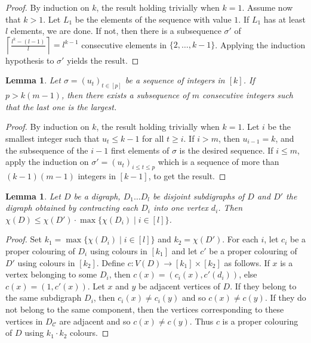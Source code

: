 \documentclass[utf8,10pt]{article}
\theoremstyle{plain}
\newtheorem{lemma}[theorem]{Lemma}
\theoremstyle{definition}
\theoremstyle{remark}
\begin{document}
\begin{proof}
By induction on $k$, the result holding trivially when $k=1$. Assume now that $k>1$. Let $L_1$ be the elements of the sequence with value $1$. If $L_1$ has at least $l$ elements, we are done.
If not, then there is a subsequence $\sigma'$ of $\left\lceil \frac{l^k-(l-1)}{l}\right \rceil = l^{k-1}$ consecutive elements in $\{2, \dots , k-1\}$. Applying the induction hypothesis to $\sigma'$ yields the result.
\end{proof}

\begin{lemma}\label{max}
Let $\sigma=(u_t)_{t\in [p]}$ be a sequence of integers in $[k]$. 
If $p > k (m-1)$, then there exists a subsequence of $m$ consecutive integers such that the
last one is the largest.
\end{lemma}

\begin{proof}
By induction on $k$, the result holding trivially when $k=1$. 
Let $i$ be the smallest integer such that $u_t\leq k-1$ for all $t\geq i$.
If $i>m$, then $u_{i-1}=k$, and the subsequence of the $i-1$ first elements of $\sigma$ is the desired sequence.
If $i\leq m$, apply the induction on $\sigma'=(u_t)_{i\leq t\leq p}$ which is a sequence of more than $(k-1)(m-1)$ integers in $[k-1]$, to get the result. 
\end{proof}

\begin{lemma}\label{lem:contrac}
Let $D$ be a digraph, $D_1 \dots D_l$ be disjoint subdigraphs of $D$ and $D'$ the digraph obtained by contracting each $D_i$ into
one vertex $d_i$. Then $\chi(D) \leq \chi(D')\cdot \max\{\chi(D_i) \mid i \in [l]\}$.
\end{lemma}

\begin{proof}

Set $k_1 = \max\{\chi(D_i) \mid i \in [l]\}$ and $k_2 = \chi(D')$. For each $i$, let $c_i$ be a proper colouring of $D_i$ using colours in $[k_1]$ and let
$c'$ be a proper colouring of $D'$ using colours in $[k_2]$. 
Define $c : V(D) \rightarrow [k_1] \times [k_2]$ as follows. If $x$ is a vertex belonging to some $D_i$, then $c(x) = (c_i(x), c'(d_i))$, else $c(x) =(1,c'(x))$. 
Let $x$ and $y$ be adjacent vertices of $D$. If they belong to the same subdigraph $D_i$, then $c_i(x) \not = c_i(y)$ and so $c(x) \not = c(y)$. If they do not belong
to the same component, then the vertices corresponding to these vertices in $D_{\mathcal{C}}$ are adjacent and so $c(x) \not = c(y)$. 
Thus $c$ is a proper colouring of $D$ using $k_1\cdot k_2$ colours. 
\end{proof}
\end{document}
